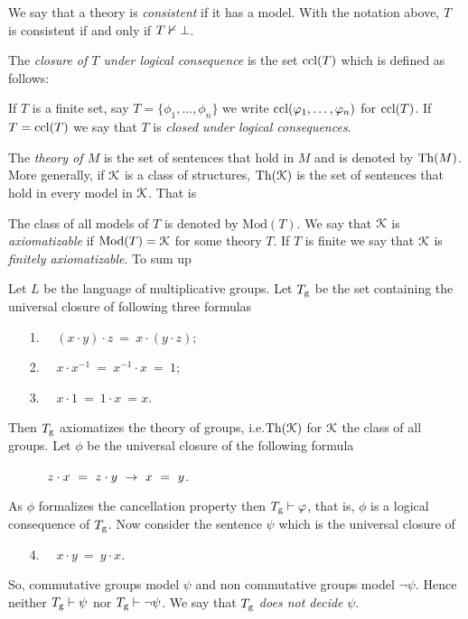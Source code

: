 \documentclass[creche.tex]{subfiles}
\begin{document}
We say that a theory is \emph{consistent\/} if it has a model.
With the notation above, $T$ is consistent if and only if \emph{$T\nvdash\bot$}.


The \emph{closure of $T$ under logical consequence\/} is the set ${\rm ccl}(T)$ which is defined as follows:  


If $T$ is a finite set, say $T=\big\{\phi_1,\dots,\phi_n\big\}$ we write ${\rm ccl}(\varphi_1,\dots,\varphi_n)$ for ${\rm ccl}(T)$.
If $T={\rm ccl}(T)$ we say that $T$ is \emph{closed under logical consequences}.

The \emph{theory of $M$\/} is the set of sentences that hold in $M$ and is denoted by \emph{$\textrm{Th}(M)$}.
More generally, if $\EuScript K$ is a class of structures, \emph{$\textrm{Th}(\EuScript K)$} is the set of sentences that hold in every model in $\EuScript K$.
That is


The class of all models of $T$ is denoted by \emph{$\textrm{Mod}(T)$}.
We say that $\EuScript K$ is \emph{axiomatizable\/} if $\mathop{\rm Mod}(T)=\EuScript K$ for some theory $T$.
If $T$ is finite we say that $\EuScript K$ is \emph{finitely axiomatizable}.
To sum up





\begin{example}\label{Tg}
Let $L$ be the language of multiplicative groups.
Let $T_{\rm g}$ be the set containing the universal closure of following three formulas
\begin{itemize}
\item[1.]\ \  $(x\cdot y)\cdot z\ =\ x\cdot(y\cdot z)$;
\item[2.]\ \  $ x\cdot x^{-1}\ =\ x^{-1}\cdot x\ =\ 1$;
\item[3.]\ \  $x\cdot 1\ =\ 1\cdot x\ =x$.
\end{itemize}
Then $T_{\rm g}$ axiomatizes the theory of groups, i.e.\@ $\textrm{Th}(\EuScript K)$ for $\EuScript K$ the class of all groups.
Let $\phi$ be the universal closure of the following formula
\begin{itemize}
\item[]\ \  $\ z\cdot x\ =\  z\cdot y\ \imp\ x\ =\ y$.
\end{itemize}
As $\phi$ formalizes the cancellation property then $T_{\rm g} \vdash\varphi$, that is, $\phi$ is a logical consequence of $T_{\rm g}$.
Now consider the sentence $\psi$ which is the universal closure of
\begin{itemize}
\item[4.]\ \  $x\cdot y\ =\ y\cdot x$.
\end{itemize}
So, commutative groups model $\psi$ and non commutative groups model $\neg\psi$.
Hence neither $T_{\rm g}\vdash\psi$ nor $T_{\rm g}\vdash\neg\psi$.
We say that $T_{\rm g}$ \emph{does not decide\/} $\psi$.\QED
\end{example}
\end{document}

